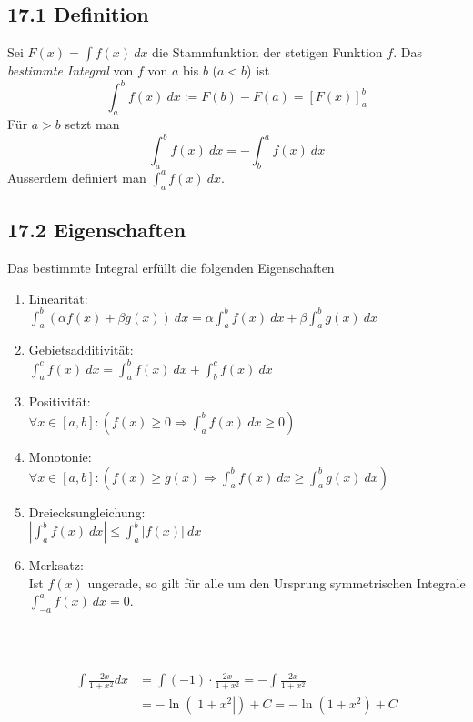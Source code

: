 \documentclass[a4paper,landscape,8pt]{extarticle}
\newcommand{\abs}[1]{\left\lvert #1 \right\rvert}
\newcommand{\sep}{\vspace{5pt}\noindent\hrule\vspace{5pt}}
\renewcommand*{\newpage}{ \ }
\begin{document}
\begin{multicols*}{4}
\subsection{17.1 Definition}

\Def Sei $F(x) = \int f(x) \ dx	$ die Stammfunktion der stetigen Funktion $f$.
Das \emph{bestimmte Integral} von $f$ von $a$ bis $b$ ($a<b$) ist
\[
\int_a^b f(x) \ dx := F(b) - F(a) = \left[F(x)\right]_a^b
\]
Für $a>b$ setzt man
\[
\int_a^b f(x) \ dx = - \int_b^a f(x) \ dx
\]
Ausserdem definiert man $\int_a^a f(x) \ dx$.

\subsection{17.2 Eigenschaften}

Das bestimmte Integral erfüllt die folgenden Eigenschaften
\begin{enumerate}[label=\alph*)]
  \item Linearität:\\
  $\int_a^b (\alpha f(x) + \beta g(x)) \ dx = \alpha \int_a^b f(x) \ dx + \beta
  \int_a^b g(x) \ dx$
  \item Gebietsadditivität:\\
  $\int_a^c f(x) \ dx = \int_a^b f(x) \ dx + \int_b^c f(x) \ dx$
  \item Positivität:\\
  $\forall x\in [a,b] \colon \left( f(x)\geq 0 \Longrightarrow \int_a^b f(x)\ dx
  \geq 0\right)$
  \item Monotonie:\\
  $\forall x\in [a,b] \colon \left( f(x)\geq g(x) \Longrightarrow \int_a^b f(x)
  \ dx \geq \int_a^b g(x) \ dx \right)$
  \item Dreiecksungleichung:\\
  $\abs{\int_a^b f(x) \ dx} \leq \int_a^b \abs{f(x)} \ dx$
  \item Merksatz:\\
  Ist $f(x)$ ungerade, so gilt für alle um den Ursprung symmetrischen Integrale
  $\int_{-a}^a f(x) \ dx = 0$.
\end{enumerate}

\newpage

\begin{warmup}
\sep

\Bsp 
\begin{align*}
\int \frac{-2x}{1+x^2} dx 
&= \int (-1)\cdot \frac{2x}{1+x^2}
= -\int \frac{2x}{1+x^2}\\
&= -\ln(\abs{1+x^2}) + C
= -\ln(1+x^2) + C
\end{align*}


\end{warmup}
\end{multicols*}
\end{document}
